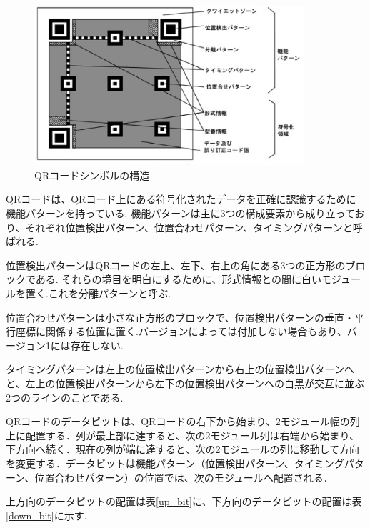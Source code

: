 \documentclass{thesis}
\begin{document}
\begin{figure}[H]
\centering
\includegraphics[width=10cm,clip]{pic/qrcode_config.eps}
\caption{QRコードシンボルの構造\cite{jis}}
\label{fig:qrcode_config}
\end{figure}

QRコードは、QRコード上にある符号化されたデータを正確に認識するために機能パターンを持っている.
機能パターンは主に3つの構成要素から成り立っており、それぞれ位置検出パターン、位置合わせパターン、タイミングパターンと呼ばれる.

位置検出パターンはQRコードの左上、左下、右上の角にある3つの正方形のブロックである.
それらの境目を明白にするために、形式情報との間に白いモジュールを置く.これを分離パターンと呼ぶ.

位置合わせパターンは小さな正方形のブロックで、位置検出パターンの垂直・平行座標に関係する位置に置く.バージョンによっては付加しない場合もあり、バージョン1には存在しない.

タイミングパターンは左上の位置検出パターンから右上の位置検出パターンへと、左上の位置検出パターンから左下の位置検出パターンへの白黒が交互に並ぶ$2$つのラインのことである.

QRコードのデータビットは、QRコードの右下から始まり、2モジュール幅の列上に配置する．列が最上部に達すると、次の2モジュール列は右端から始まり、下方向へ続く．現在の列が端に達すると、次の2モジュールの列に移動して方向を変更する．データビットは機能パターン（位置検出パターン、タイミングパターン、位置合わせパターン）の位置では、次のモジュールへ配置される．

上方向のデータビットの配置は表\ref{up_bit}に、下方向のデータビットの配置は表\ref{down_bit}に示す.
\end{document}
